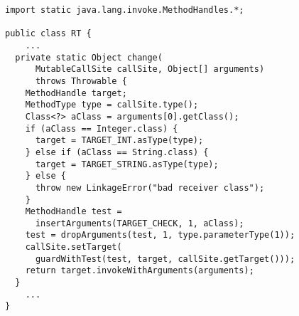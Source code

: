 {\scriptsize \begin{verbatim}
import static java.lang.invoke.MethodHandles.*;

public class RT {
    ...
  private static Object change(
      MutableCallSite callSite, Object[] arguments)
      throws Throwable {
    MethodHandle target;
    MethodType type = callSite.type();
    Class<?> aClass = arguments[0].getClass();
    if (aClass == Integer.class) {
      target = TARGET_INT.asType(type);
    } else if (aClass == String.class) {
      target = TARGET_STRING.asType(type);
    } else {
      throw new LinkageError("bad receiver class");
    }
    MethodHandle test =
      insertArguments(TARGET_CHECK, 1, aClass);
    test = dropArguments(test, 1, type.parameterType(1));
    callSite.setTarget(
      guardWithTest(test, target, callSite.getTarget()));
    return target.invokeWithArguments(arguments);
  }
    ...
}
\end{verbatim} }
